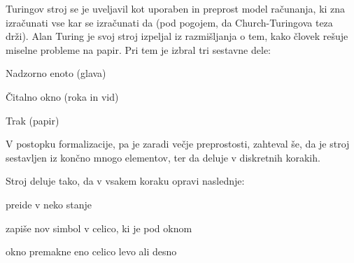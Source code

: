 \documentclass[10pt,a4paper,oneside]{book}
\begin{document}
\pagebreak
{}
Turingov stroj se je uveljavil kot uporaben in preprost model računanja, ki zna izračunati vse kar se izračunati da (pod pogojem, da Church-Turingova teza drži). Alan Turing je svoj stroj izpeljal iz razmišljanja o tem, kako človek rešuje miselne probleme na papir. Pri tem je izbral tri sestavne dele:
\begin{items}
\item Nadzorno enoto (glava)
\item Čitalno okno (roka in vid)
\item Trak (papir)
\end{items}
V postopku formalizacije, pa je zaradi večje preprostosti, zahteval še, da je stroj sestavljen iz končno mnogo elementov, ter da deluje v diskretnih korakih.%


Stroj deluje tako, da v vsakem koraku opravi naslednje:
\begin{items}
	\item preide v neko stanje
	\item zapiše nov simbol v celico, ki je pod oknom
	\item okno premakne eno celico levo ali desno
\end{items}

\end{document}
